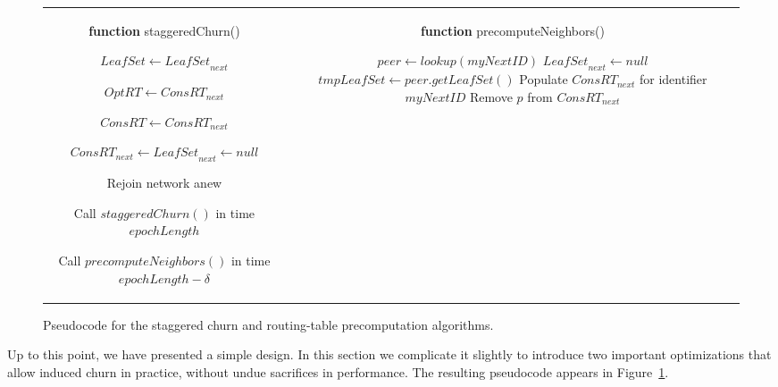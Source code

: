 \documentclass[10pt,twocolumn]{article}
\begin{document}
\begin{figure}
\begin{tabular}{cc}
\begin{minipage}{3.5in}
\textbf{function} staggeredChurn()
\begin{algorithmic}[1]
\STATE $\mathit{LeafSet} \leftarrow \mathit{LeafSet}_\mathit{next}$

\STATE $\mathit{OptRT} \leftarrow \mathit{ConsRT}_\mathit{next}$

\STATE $\mathit{ConsRT} \leftarrow \mathit{ConsRT}_\mathit{next}$

\STATE $\mathit{ConsRT}_\mathit{next} \leftarrow \mathit{LeafSet}_\mathit{next} \leftarrow null$

\IF {$\mathit{LeafSet} = null$}

\STATE Rejoin network anew

\ENDIF

\STATE Call $\mathit{staggeredChurn()}$ in time $\mathit{epochLength}$ 

\STATE Call $\mathit{precomputeNeighbors()}$ in time
$\mathit{epochLength} - \delta$

\end{algorithmic}
\end{minipage}&\begin{minipage}{3.5in}
\textbf{function} precomputeNeighbors()
\begin{algorithmic}[1]
\STATE $\mathit{peer} \leftarrow \mathit{lookup(myNextID)}$
\STATE $\mathit{LeafSet}_\mathit{next} \leftarrow \mathit{null}$
\STATE $\mathit{tmpLeafSet} \leftarrow \mathit{peer.getLeafSet()}$
\FORALL{$p \in \mathit{tmpLeafSet}$}
	\IF {$\mathit{nextChurnTime} < \mathit{expireTime}(p)$} 
		\STATE {$\mathit{LeafSet}_\mathit{next}.\mathit{add}(p)$}
	\ENDIF
\ENDFOR
\STATE Populate $\mathit{ConsRT}_\mathit{next}$ for identifier
$\mathit{myNextID}$
\FORALL{$p \in \mathit{ConsRT}_\mathit{next}$}
	\IF {$\mathit{nextChurnTime} < \mathit{expireTime}(p)$} 
		\STATE Remove $p$ from $\mathit{ConsRT}_\mathit{next}$
	\ENDIF
\ENDFOR 
\end{algorithmic}
\end{minipage}
\end{tabular}
\caption{Pseudocode for the staggered churn and routing-table precomputation algorithms.\label{fig:pseudocode}}
\end{figure}
Up to this point, we have presented a simple design.
In this section we complicate it slightly to
introduce two important optimizations that allow induced churn
in practice, without undue sacrifices in performance.  The resulting
pseudocode appears in Figure~\ref{fig:pseudocode}.
\end{document}

